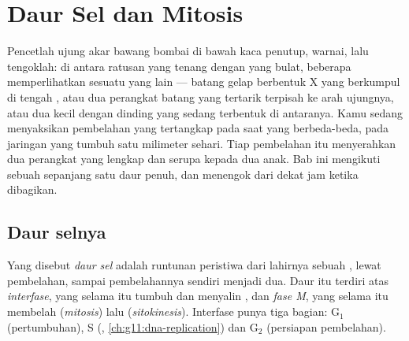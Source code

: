 \chapter{Daur Sel dan Mitosis}\label{ch:g11:cell-cycle-mitosis}

Pencetlah ujung akar bawang bombai di bawah kaca penutup, warnai, lalu
tengoklah: di antara ratusan  yang tenang dengan  yang
bulat, beberapa memperlihatkan sesuatu yang lain --- batang gelap
berbentuk X yang berkumpul di tengah , atau dua perangkat batang
yang tertarik terpisah ke arah ujungnya, atau dua  kecil dengan
dinding yang sedang terbentuk di antaranya. Kamu sedang menyaksikan
pembelahan  yang tertangkap pada saat yang berbeda-beda, pada
jaringan yang tumbuh satu milimeter sehari. Tiap pembelahan itu
menyerahkan dua perangkat  yang lengkap dan serupa kepada dua
 anak. Bab ini mengikuti sebuah  sepanjang satu daur penuh, dan
menengok dari dekat jam ketika  dibagikan.

\section{Daur selnya}

\begin{definition}\label{def:g11:cell-cycle-mitosis:cycle}
Yang disebut \emph{daur sel} adalah runtunan peristiwa
dari lahirnya sebuah , lewat pembelahan, sampai pembelahannya
sendiri menjadi dua. Daur itu terdiri atas \emph{interfase}, yang
selama itu  tumbuh dan menyalin , dan \emph{fase M}, yang
selama itu  membelah (\emph{mitosis}) lalu
 (\emph{sitokinesis}). Interfase punya tiga bagian:
$\mathrm{G_1}$ (pertumbuhan), S (,
\cref{ch:g11:dna-replication}) dan $\mathrm{G_2}$ (persiapan pembelahan).
\end{definition}

